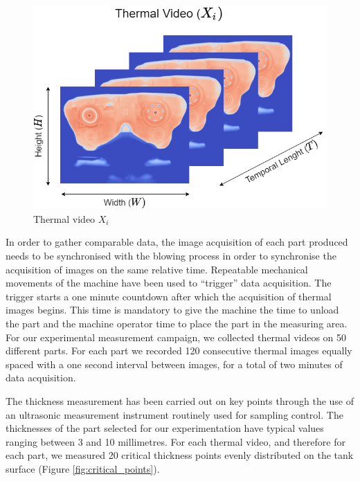 \begin{figure}
\centering
\includegraphics[scale=0.55]{images/chapter_4/Thermal_video.png}
\caption{Thermal video $X_i$}
\label{fig:thermal_video}
\end{figure}
%
In order to gather comparable data, the image acquisition of each part produced needs to be synchronised with the blowing process in order to synchronise the acquisition of images on the same relative time. Repeatable mechanical movements of the machine have been used to “trigger” data acquisition. The trigger starts a one minute countdown after which the acquisition of thermal images begins. This time is mandatory to give the machine the time to unload the part and the machine operator time to place the part in the measuring area. For our experimental measurement campaign, we collected thermal videos on 50 different parts. For each part we recorded 120 consecutive thermal images equally spaced with a one second interval between images, for a total of two minutes of data acquisition.

The thickness measurement has been carried out on key points through the use of an ultrasonic measurement instrument routinely used for sampling control. The thicknesses of the part selected for our experimentation have typical values ranging between 3 and 10 millimetres. For each thermal video, and therefore for each part, we measured 20 critical thickness points evenly distributed on the tank surface (Figure \ref{fig:critical_points}).

